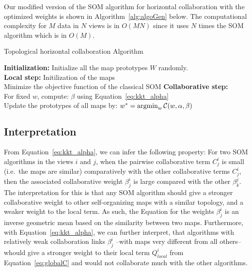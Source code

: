 \medskip
Our modified version of the SOM algorithm for horizontal collaboration with the optimized weights is shown in Algorithm~\ref{alg:algoGen} below. The computational complexity for $M$ data in $N$ views is in $O(MN)$ since it uses $N$ times the SOM algorithm which is in $O(M)$.

\begin{algorithm}[!h]
\label{alg:algoGen}
\SetAlgoLined{}
	\vspace{0.05cm}
	\caption{Topological horizontal collaboration Algorithm}
	\vspace{0.05cm}
	\textbf{Initialization:} Initialize all the map prototypes $W$ randomly. \\
	\textbf{Local step:} Initilization of the maps\\
	 {
		Minimize the objective function of the classical SOM
	} 
	\textbf{Collaborative step:}\\
	 {
		For fixed $w$, compute:
		$\beta$ using Equation~\eqref{eq:kkt_alpha} \\	 
		Update the prototypes of all maps by: 
		$ 
		w^{*} =  \operatornamewithlimits{argmin}_{w}\mathcal{C}(w,\alpha,\beta) 
		$
	}	 
\end{algorithm}

    \tableofcontents
\subsection{Interpretation}
\label{sec:interpretation}

From Equation~\eqref{eq:kkt_alpha}, we can infer the following property: For two SOM algorithms in the views $i$ and $j$, when the pairwise collaborative term $C_j^i$ is small (i.e.\ the maps are similar) comparatively with the other collaborative terms $C_j^i$, then the associated collaborative weight $\beta_j^i$ is large compared with the other $\beta_k^j$. The interpretation for this is that any SOM algorithm should give a stronger collaborative weight to other self-organizing maps with a similar topology, and a weaker weight to the local term. As such, the Equation for the weights $\beta_j^i$ is an inverse geometric mean based on the similarity between two maps. 
Furthermore, with Equation~\eqref{eq:kkt_alpha}, we can further interpret, that algorithms with relatively weak collaboration links $\beta_j^i$ --with maps very different from all others-- whould give a stronger weight to their local term $Q^i_{local}$ from Equation~\eqref{eq:globalC} and would not collaborate much with the other algorithms. 

